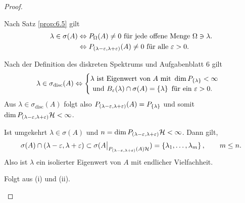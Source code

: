 \begin{proof}
\newcommand{\disc}{{\mathrm{disc}}}
\newcommand{\ess}{{\mathrm{ess}}}
\begin{proofenum}
\item
Nach Satz \ref{prop:6.5} gilt
\begin{align*}
\lambda \in \sigma(A) &
\Leftrightarrow P_{\Omega}(A) \ne 0 \text{ für jede offene Menge }
\Omega \ni \lambda.\\
& \Leftrightarrow
P_{(\lambda - \varepsilon, \lambda + \varepsilon)} (A) \ne 0 \text{ für alle }
\varepsilon > 0.
\end{align*}

\item
Nach der Definition des diskreten Spektrums und Aufgabenblatt 6 gilt
\begin{align*}
\lambda \in \sigma_{\disc}(A) \Leftrightarrow
\begin{cases}
\lambda \text{ ist Eigenwert von $A$ mit } \dim P_{\setd{\lambda}} < \infty\\
\text{ und }
B_{\ep}(\lambda) \cap \sigma(A) = \setd{\lambda}
\ \text{für ein}\ \ep > 0.
\end{cases}
\end{align*}
Aus $\lambda \in \sigma_\disc(A)$ folgt also
$P_{(\lambda - \varepsilon, \lambda + \varepsilon)} (A) = P_{\left\{ \lambda \right\}}$
und somit $\dim P_{(\lambda - \varepsilon, \lambda + \varepsilon)} \mathcal{H} < \infty$.

Ist umgekehrt $\lambda \in \sigma(A)$ und
$n = \dim P_{(\lambda - \varepsilon, \lambda + \varepsilon)} \mathcal{H} < \infty$.
Dann gilt,
\begin{align*}
\sigma(A)\cap(\lambda-\varepsilon,\lambda+\varepsilon)\subset\sigma(A \big|_{
P_{(\lambda - \varepsilon, \lambda + \varepsilon)}(A) \mathcal{H}})
= \left\{  \lambda_1, \ldots, \lambda_m \right\},\qquad m\leq n.
\end{align*}
Also ist $\lambda$ ein isolierter Eigenwert von $A$ mit endlicher Vielfachheit.

\item
Folgt aus (i) und (ii).\qedhere
\end{proofenum}
\end{proof}